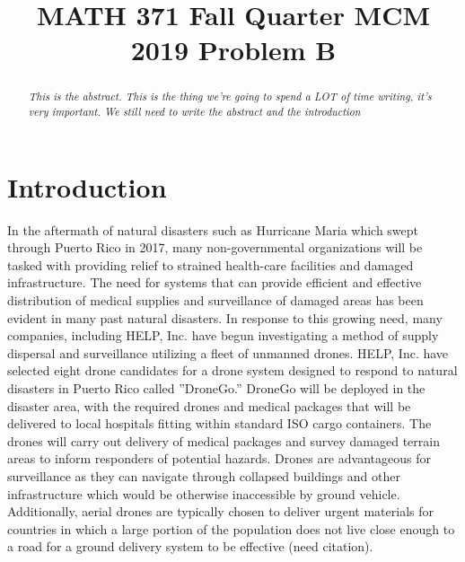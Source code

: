 \documentclass[twocolumn,10pt]{asme2ej}
\title{MATH 371 Fall Quarter MCM 2019 Problem B}
\begin{document}
\maketitle


\begin{abstract}
{\it This is the abstract. This is the thing we're going to spend a LOT of time writing, it's very important. We still need to write the abstract and the introduction
}
\end{abstract}



\section{Introduction}
In the aftermath of natural disasters such as Hurricane Maria which swept through Puerto Rico in 2017, many non-governmental organizations will be tasked with providing relief to strained health-care facilities and damaged infrastructure. The need for systems that can provide efficient and effective distribution of medical supplies and surveillance of damaged areas has been evident in many past natural disasters. In response to this growing need, many companies, including HELP, Inc. have begun investigating a method of supply dispersal and surveillance utilizing a fleet of unmanned drones. HELP, Inc. have selected eight drone candidates for a drone system designed to respond to natural disasters in Puerto Rico called ”DroneGo.” DroneGo will be deployed in the disaster area, with the required drones and medical packages that will be delivered to local hospitals fitting within standard ISO cargo containers. The drones will carry out delivery of medical packages and survey damaged terrain areas to inform responders of potential hazards. Drones are advantageous for surveillance as they can navigate through collapsed buildings and other infrastructure which would be otherwise inaccessible by ground vehicle. Additionally, aerial drones are typically chosen to deliver urgent materials for countries in which a large portion of the population does not live close enough to a road for a ground delivery system to be effective (need citation)\cite{Arribas}.
\end{document}
